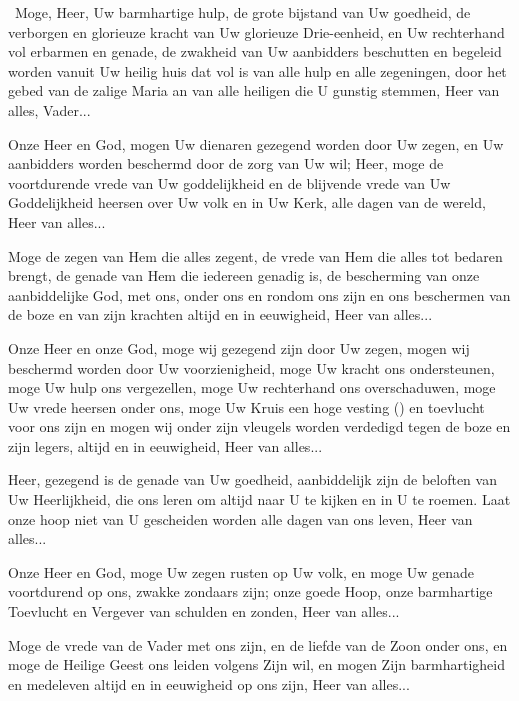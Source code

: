 \documentclass[12pt,twoside,a5paper]{article}
\begin{document}
\begin{halfparskip}
  \cc~Moge, Heer, Uw barmhartige hulp, de grote bijstand van Uw goedheid, de verborgen en glorieuze kracht van Uw glorieuze Drie-eenheid, en Uw rechterhand vol erbarmen en genade, de zwakheid van Uw aanbidders beschutten en begeleid worden vanuit Uw heilig huis dat vol is van alle hulp en alle zegeningen, door het gebed van de zalige Maria an van alle heiligen die U gunstig stemmen, Heer van alles, Vader...

   Onze Heer en God, mogen Uw dienaren gezegend worden door Uw zegen, en Uw aanbidders worden beschermd door de zorg van Uw wil; Heer, moge de voortdurende vrede van Uw goddelijkheid en de blijvende vrede van Uw Goddelijkheid heersen over Uw volk en in Uw Kerk, alle dagen van de wereld, Heer van alles...

   Moge de zegen van Hem die alles zegent, de vrede van Hem die alles tot bedaren brengt, de genade van Hem die iedereen genadig is, de bescherming van onze aanbiddelijke God, met ons, onder ons en rondom ons zijn en ons beschermen van de boze en van zijn krachten altijd en in eeuwigheid, Heer van alles...

   Onze Heer en onze God, moge wij gezegend zijn door Uw zegen, mogen wij beschermd worden door Uw voorzienigheid, moge Uw kracht ons ondersteunen, moge Uw hulp ons vergezellen, moge Uw rechterhand ons overschaduwen, moge Uw vrede heersen onder ons, moge Uw Kruis een hoge vesting () en toevlucht voor ons zijn en mogen wij onder zijn vleugels worden verdedigd tegen de boze en zijn legers, altijd en in eeuwigheid, Heer van alles...

   Heer, gezegend is de genade van Uw goedheid, aanbiddelijk zijn de beloften van Uw Heerlijkheid, die ons leren om altijd naar U te kijken en in U te roemen. Laat onze hoop niet van U gescheiden worden alle dagen van ons leven, Heer van alles...

   Onze Heer en God, moge Uw zegen rusten op Uw volk, en moge Uw genade voortdurend op ons, zwakke zondaars zijn; onze goede Hoop, onze barmhartige Toevlucht en Vergever van schulden en zonden, Heer van alles...

   Moge de vrede van de Vader met ons zijn, en de liefde van de Zoon onder ons, en moge de Heilige Geest ons leiden volgens Zijn wil, en mogen Zijn barmhartigheid en medeleven altijd en in eeuwigheid op ons zijn, Heer van alles...


\end{halfparskip}
\end{document}
